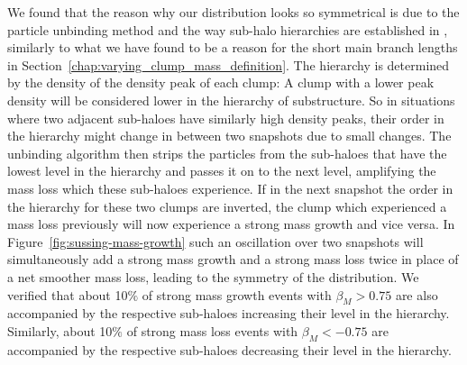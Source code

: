 We found that the reason why our distribution looks so
symmetrical is due to the particle unbinding method and the way sub-halo hierarchies are
established in \phew, similarly to what we have found to be a reason for the short main branch
lengths in Section~\ref{chap:varying_clump_mass_definition}. The hierarchy is determined by the
density of the density peak of each clump:
A clump with a lower peak density will be considered lower in the hierarchy of substructure. So in
situations where two adjacent sub-haloes have similarly high density peaks, their order in the
hierarchy might change in between two snapshots due to small changes. The unbinding algorithm then
strips the particles from the sub-haloes that have the lowest level in the hierarchy and passes it
on to the next level, amplifying the mass loss which these sub-haloes experience. If in the next
snapshot the order in the hierarchy for these two clumps are inverted, the clump which experienced
a mass loss previously will now experience a strong mass growth and vice versa. In
Figure~\ref{fig:sussing-mass-growth} such an oscillation over two snapshots will simultaneously add
a strong mass growth and a strong mass loss twice in place of a net smoother mass loss, leading to
the symmetry of the distribution. We verified that about 10$\%$ of strong mass growth events with
$\beta_M > 0.75$ are also accompanied by the respective sub-haloes increasing their level in the
hierarchy. Similarly, about 10$\%$ of strong mass loss events with $\beta_M < -0.75$ are
accompanied by the respective sub-haloes decreasing their level in the hierarchy.


